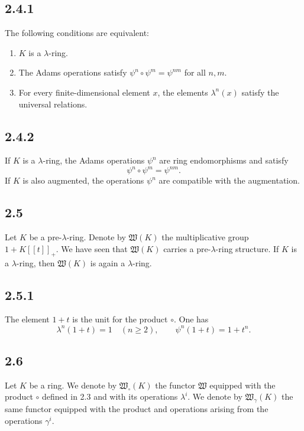 \documentclass[13pt]{extarticle}
\begin{document}
\subsection*{2.4.1}
The following conditions are equivalent:
\begin{enumerate}[label=(\roman*)]
\item $K$ is a $\lambda$-ring.
\item The Adams operations satisfy $\psi^n\circ\psi^m=\psi^{nm}$ for all $n,m$.
\item For every finite-dimensional element $x$, the elements $\lambda^n(x)$ satisfy the universal relations.
\end{enumerate}

\subsection*{2.4.2}
If $K$ is a $\lambda$-ring, the Adams operations $\psi^n$ are ring endomorphisms and satisfy
\begin{equation}\label{eq:2.4.2}
\psi^n\circ\psi^m=\psi^{nm}.
\end{equation}
If $K$ is also augmented, the operations $\psi^n$ are compatible with the augmentation.

\subsection*{2.5}
Let $K$ be a pre-$\lambda$-ring. Denote by $\mathfrak W(K)$ the multiplicative group $1+K[[t]]_+$. We have seen that $\mathfrak W(K)$ carries a pre-$\lambda$-ring structure. If $K$ is a $\lambda$-ring, then $\mathfrak W(K)$ is again a $\lambda$-ring.

\subsection*{2.5.1}
The element $1+t$ is the unit for the product $\circ$. One has
\begin{equation}\label{eq:2.5.1}
\lambda^n(1+t)=1\quad (n\geq 2),
\qquad
\psi^n(1+t)=1+t^n.
\end{equation}

\subsection*{2.6}
Let $K$ be a ring. We denote by $\mathfrak W_\circ(K)$ the functor $\mathfrak W$ equipped with the product $\circ$ defined in 2.3 and with its operations $\lambda^i$. We denote by $\mathfrak W_\gamma(K)$ the same functor equipped with the product and operations arising from the operations $\gamma^i$.
\end{document}
